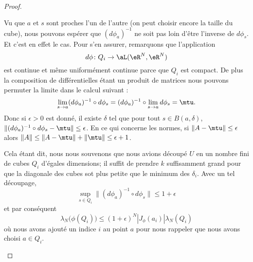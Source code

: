 \begin{proof}
\begin{enumerate}
\begin{subproof}
\begin{equation}
			      \end{equation}
			      Vu que \( a\) et \( s\) sont proches l'un de l'autre (on peut choisir encore la taille du cube), nous pouvons espérer que \( (d\phi_a)^{-1}\) ne soit pas loin d'être l'inverse de \( d\phi_s\). Et c'est en effet le cas. Pour s'en assurer, remarquons que l'application
			      \begin{equation}
				      d\phi\colon Q_i\to \aL(\eR^N,\eR^N)
			      \end{equation}
			      est continue et même uniformément continue parce que \( Q_i\) est compact. De plus la composition de différentielles étant un produit de matrices nous pouvons permuter la limite dans le calcul suivant :
			      \begin{equation}
				      \lim_{s\to a}(d\phi_a)^{-1}\circ d\phi_s=(d\phi_a)^{-1}\circ\lim_{s\to a}d\phi_s=\mtu.
			      \end{equation}
			      Donc si \( \epsilon>0\) est donné, il existe \( \delta\) tel que pour tout \( s\in B(a,\delta)\), \( \| (d\phi_a)^{-1}\circ d\phi_s-\mtu \|\leq \epsilon\). En ce qui concerne les  normes, si \( \| A-\mtu \|\leq \epsilon\) alors \( \| A \|\leq \| A-\mtu \|+\| \mtu \|\leq \epsilon+1\).

			      Cela étant dit, nous nous souvenons que nous avions découpé \( U\) en un nombre fini de cubes \( Q_i\) d'égales dimensions; il suffit de prendre \( k\) suffisamment grand pour que la diagonale des cubes sot plus petite que le minimum des \( \delta_i\). Avec un tel découpage,
			      \begin{equation}
				      \sup_{s\in Q_i}\| (d\phi_a)^{-1}\circ d\phi_s \|\leq 1+\epsilon
			      \end{equation}
			      et par conséquent
			      \begin{equation}        \label{EqooQRMNooZduAkX}
				      \lambda_N\big( \phi(Q_i) \big)\leq (1+\epsilon)^N| J_{\phi}(a_i) |\lambda_N(Q_i)
			      \end{equation}
			      où nous avons ajouté un indice \( i\) au point \( a\) pour nous rappeler que nous avons choisi \( a\in Q_i\).


\end{subproof}
\end{enumerate}
\end{proof}
